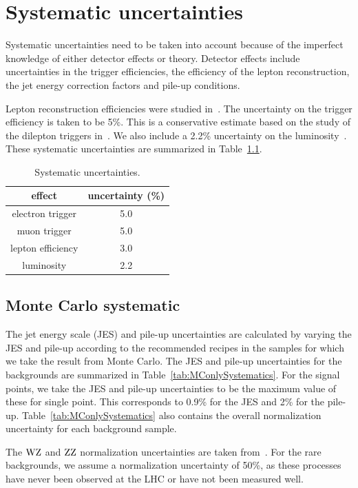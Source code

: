 \chapter{Systematic uncertainties}\label{chap:systematics}
Systematic uncertainties need to be taken into account because of the
imperfect knowledge of either detector effects or theory.
Detector effects include uncertainties in the trigger efficiencies, the
efficiency of the lepton reconstruction, the jet energy correction factors
and pile-up conditions.

Lepton reconstruction efficiencies were studied in~\cite{CMS-EXO-12-001}. The uncertainty on the trigger
efficiency is taken to be 5\%. This is a conservative estimate based on the study of the dilepton triggers in~\cite{bprime2011}. We also include a 2.2\% uncertainty 
on the luminosity~\cite{CMS-SMP-12-008}. These systematic uncertainties are summarized in Table~\ref{tab:Systematics}.

\begin{table}
    \centering
\begin{tabular}{*2c}
    \toprule
          effect & uncertainty (\%) \\
          \midrule
  electron trigger          & 5.0 \\
  muon trigger              & 5.0 \\
  lepton efficiency         & 3.0 \\
  luminosity                & 2.2 \\
  \midrule
\end{tabular}
\caption{Systematic uncertainties.}
\label{tab:Systematics}
\end{table}

\section{Monte Carlo systematic}
The jet energy scale (JES) and pile-up uncertainties are calculated by
varying the JES and pile-up according to the recommended recipes in the samples for which 
we take the result from Monte Carlo. The JES and pile-up uncertainties for the backgrounds are 
summarized in Table~\ref{tab:MConlySystematics}. For the signal points, we
take the JES and pile-up uncertainties to be the maximum value of these for single
point. This corresponds to 0.9\% for the JES and 2\% for the pile-up. Table~\ref{tab:MConlySystematics} also
contains the overall normalization uncertainty for each background sample.

The $\mathrm{W}\mathrm{Z}$ and $\mathrm{Z}\mathrm{Z}$ normalization uncertainties are taken from~\cite{CMS-AN-2011-333}. 
For the rare backgrounds, we assume a normalization uncertainty of 50\%, as
these processes have never been observed at the LHC or have not been
measured well.

